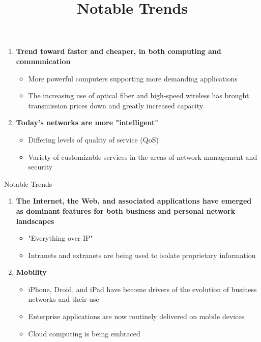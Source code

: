 \documentclass[pdflatex,compress]{beamer}
\begin{document}
\begin{frame}
	\title{Notable Trends}
	\begin{enumerate}
		\item \textbf{Trend toward faster and cheaper, in both computing and communication}
		\begin{itemize}
			\item More powerful computers supporting more demanding applications
			\item The increasing use of optical fiber and high-speed wireless has brought transmission prices down and greatly increased capacity
		\end{itemize}
		\item \textbf{Today's networks are more "intelligent"}
		\begin{itemize}
			\item Differing levels of quality of service (QoS)
			\item Variety of customizable services in the areas of network management and security
		\end{itemize}
	\end{enumerate}
\end{frame}

\begin{frame}{Notable Trends}
	\begin{enumerate}
		\item \textbf{The Internet, the Web, and associated applications have emerged as dominant features for both business and personal network landscapes}
		\begin{itemize}
			\item "Everything over IP"
			\item Intranets and extranets are being used to isolate proprietary information
		\end{itemize}
		\item \textbf{Mobility}
		\begin{itemize}
			\item iPhone, Droid, and iPad have become drivers of the evolution of business networks and their use
			\item Enterprise applications are now routinely delivered on mobile devices
			\item Cloud computing is being embraced
		\end{itemize}
	\end{enumerate}
\end{frame}
\end{document}
